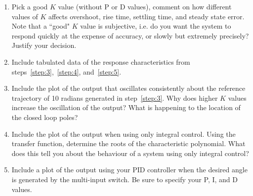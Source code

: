 \documentclass[letterpaper, 11pt, openany]{book}
\begin{document}
\begin{enumerate}
\item Pick a good $K$ value (without P or D values), comment on how different values of $K$ affects overshoot,
 rise time, settling time, and steady state error. Note that a ``good" $K$ value is subjective, i.e. do you want
the system to respond quickly at the expense of accuracy, or slowly but extremely precisely? Justify your decision.
\item Include tabulated data of the response characteristics from steps~\ref{step:3},~\ref{step:4}, and~\ref{step:5}. 
\item Include the plot of the output that oscillates consistently about the reference trajectory of 10 radians 
generated in step~\ref{step:3}. Why does higher $K$ values increase the oscillation of the output? What is 
happening to the location of the closed loop poles? 
\item Include the plot of the output when using only integral control. Using the transfer function, determine the roots
of the characteristic polynomial.  What does this tell you about the behaviour of a system using only integral control?
\item Include a plot of the output using your PID controller when the desired angle is generated by the multi-input 
switch. Be sure to specify your P, I, and D values. 
\end{enumerate}
\end{document}
